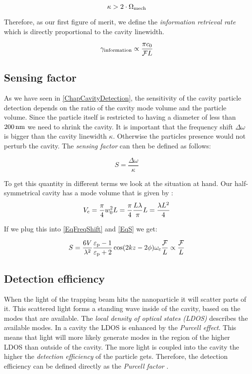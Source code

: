 \begin{equation}
	\kappa > 2\cdot\de{\Omega}{mech}
\end{equation}

Therefore, as our first figure of merit, we define the \textit{information retrieval rate} which is directly proportional to the cavity linewidth.

\begin{equation}
	\de{\gamma}{information}\propto \frac{\pi c_0}{\mathcal{F}L}
\end{equation}

\subsection{Sensing factor}\label{ChapSensingFactor}
As we have seen in \autoref{ChapCavityDetection}, the sensitivity of the cavity particle detection depends on the ratio of the cavity mode volume and the particle volume. Since the particle itself is restricted to having a diameter of less than $200\nm$ we need to shrink the cavity. It is important that the frequency shift $\Delta\omega$ is bigger than the cavity linewidth $\kappa$. Otherwise the particles presence would not perturb the cavity. The \textit{sensing factor} can then be defined as follows:

\begin{equation}\label{EqS}
	S=\frac{\Delta\omega}{\kappa}
\end{equation}

To get this quantity in different terms we look at the situation at hand. Our half-symmetrical cavity has a mode volume that is given by \cite[p.~752]{siegman1986lasers}:
\begin{equation}
	\de{V}{c}=\frac{\pi}{4}w_0^2L=\frac{\pi}{4}\frac{L\lambda}{\pi}L=\frac{\lambda L^2}{4}
\end{equation}

If we plug this into \autoref{EqFreqShift} and \autoref{EqS} we get:

\begin{equation}\label{EqSensingFactor}
	S=\frac{6V}{\lambda^2}\frac{\de{\varepsilon}{p}-1}{\de{\varepsilon}{p}+2}\cos(2kz-2\phi)\de{\omega}{c}\frac{\mathcal{F}}{L}\propto\frac{\mathcal{F}}{L}
\end{equation}

\subsection{Detection efficiency}
When the light of the trapping beam hits the nanoparticle it will scatter parts of it. This scattered light forms a standing wave inside of the cavity, based on the modes that are available. The \textit{local density of optical states (LDOS)} describes the available modes. In a cavity the LDOS is enhanced by the \textit{Purcell effect}. This means that light will more likely generate modes in the region of the higher LDOS than outside of the cavity. The more light is coupled into the cavity the higher the \textit{detection efficiency} of the particle gets. Therefore, the detection efficiency can be defined directly as the \textit{Purcell factor} \cite{dowling1991radiation}.


